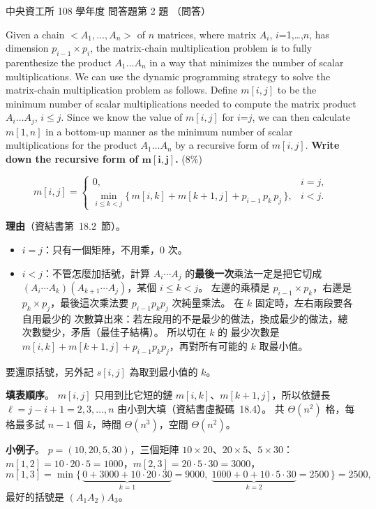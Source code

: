 \begin{pastexam}[label={px:ncu-108-dsa-14}]{中央資工所 108 學年度 問答題第 2 題}
（問答）

Given a chain $<A_1, \ldots, A_n>$ of $n$ matrices, where matrix $A_i$, $i$=1,\ldots,$n$, has dimension
$p_{i-1}{\times}p_i$, the matrix-chain multiplication problem is to fully parenthesize the product
$A_1 \ldots A_n$ in a way that minimizes the number of scalar multiplications. We can use the dynamic
programming strategy to solve the matrix-chain multiplication problem as follows. Define $m[i, j]$ to
be the minimum number of scalar multiplications needed to compute the matrix product $A_i \ldots A_j$,
$i{\le}j$. Since we know the value of $m[i, j]$ for $i$=$j$, we can then calculate $m[1, n]$ in a
bottom-up manner as the minimum number of scalar multiplications for the product $A_1 \ldots A_n$ by a
recursive form of $m[i, j]$.
\textbf{Write down the recursive form of $\boldsymbol{m[i, j]}$.} (8\%)
\end{pastexam}

\begin{pastsoln}
\[
m[i, j] = \begin{cases}
0, & i = j,\\[2pt]
\displaystyle\min_{i \le k < j} \bigl\{\, m[i, k] + m[k+1, j] + p_{i-1}\, p_k\, p_j \,\bigr\}, & i < j.
\end{cases}
\]

\textbf{理由}（資結書第~18.2~節）。
\begin{itemize}
\item $i = j$：只有一個矩陣，不用乘，$0$ 次。
\item $i < j$：不管怎麼加括號，計算 $A_i \cdots A_j$ 的\textbf{最後一次}乘法一定是把它切成
$(A_i \cdots A_k)(A_{k+1} \cdots A_j)$，某個 $i \le k < j$。 左邊的乘積是 $p_{i-1} \times p_k$，右邊是
$p_k \times p_j$，最後這次乘法要 $p_{i-1} p_k p_j$ 次純量乘法。 在 $k$ 固定時，左右兩段要各自用最少的
次數算出來：若左段用的不是最少的做法，換成最少的做法，總次數變少，矛盾（最佳子結構）。 所以切在 $k$ 的
最少次數是 $m[i, k] + m[k+1, j] + p_{i-1} p_k p_j$，再對所有可能的 $k$ 取最小值。
\end{itemize}
要還原括號，另外記 $s[i, j]$ 為取到最小值的 $k$。

\textbf{填表順序}。 $m[i, j]$ 只用到比它短的鏈 $m[i, k]$、$m[k+1, j]$，所以依鏈長 $\ell = j - i + 1 = 2, 3, \ldots, n$
由小到大填（資結書虛擬碼~18.4）。 共 $\Theta(n^2)$ 格，每格最多試 $n - 1$ 個 $k$，時間 $\Theta(n^3)$，空間 $\Theta(n^2)$。

\textbf{小例子}。 $p = (10, 20, 5, 30)$，三個矩陣 $10 \times 20$、$20 \times 5$、$5 \times 30$：
$m[1,2] = 10 \cdot 20 \cdot 5 = 1000$，$m[2,3] = 20 \cdot 5 \cdot 30 = 3000$，
\[
m[1,3] = \min\bigl\{\, \underbrace{0 + 3000 + 10 \cdot 20 \cdot 30}_{k = 1} = 9000,\;
\underbrace{1000 + 0 + 10 \cdot 5 \cdot 30}_{k = 2} = 2500 \,\bigr\} = 2500,
\]
最好的括號是 $(A_1 A_2) A_3$。
\end{pastsoln}
